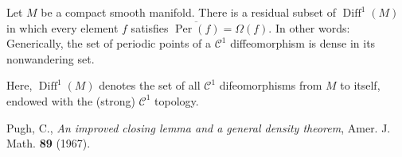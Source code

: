\documentclass[12pt]{article}
\newcommand{\Per}{\operatorname{Per}}
\newcommand{\Diff}{\operatorname{Diff}}
\newcommand{\Cdiff}{\mathcal{C}}
\begin{document}
Let $M$ be a compact smooth manifold. There is a residual subset of $\Diff^1(M)$ in which every element $f$ satisfies $\overline{\Per(f)}= \Omega(f)$.
In other words: Generically, the set of periodic points of a $\Cdiff^1$ diffeomorphism is dense in its nonwandering set.

Here, $\Diff^1(M)$ denotes the set of all $\Cdiff^1$ difeomorphisms from $M$ to 
itself, endowed with the (strong) $\Cdiff^1$ topology.

\begin{thebibliography}{9}
 Pugh, C., \emph{An improved closing lemma and a general density theorem}, Amer. J. Math. \textbf{89} (1967).
\end{thebibliography}
\end{document}
